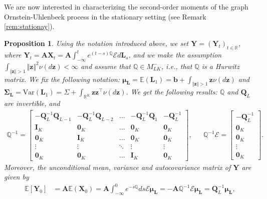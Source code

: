 \documentclass[12pt]{amsart}
\newtheorem{prop}{Proposition}[section]
\numberwithin{equation}{section}
\newcommand{\E}{\mathbb{E}}
\newcommand{\1}{\mathbf{1}}
\begin{document}
We are now interested in characterizing the second-order moments of the graph Ornstein-Uhlenbeck process in the stationary setting (see Remark \ref{rem:stationay}). 
\begin{prop}\label{prop:secondorder} Using the notation introduced above, we set $\mathbf{Y}=(\mathbf{Y}_t)_{t\in \mathbb{R}}$, where $\mathbf{Y}_t=\mathbf{A}\mathbf{X}_t=\mathbf{A}\int_{-\infty}^t e^{(t-s)\mathbb{Q}}\mathcal{E}d\mathbf{L}_s$, and we make the assumption $\int_{\Vert\mathbf{z}\Vert>1}\Vert\mathbf{z}\Vert^2\nu(d\mathbf{z})<\infty$ and assume that
$\mathbb{Q}\in M_{LK}^-$, i.e., that $\mathbb{Q}$ is a Hurwitz matrix. We fix the following notation:
$\boldsymbol{\mu}_{\mathbf{L}}=\E(\mathbf{L}_1)=\mathbf{b}+\int_{\Vert\mathbf{z}\Vert>1}\mathbf{z}\nu(d\mathbf{z})$ and $\boldsymbol{\Sigma}_{\mathbf{L}}=\text{Var}(\mathbf{L}_1)=\Sigma +\int_{\mathbb{R}^K}\mathbf{z}\mathbf{z}^{\top} \nu(d\mathbf{z})$. We get the following results: $\mathbb{Q}$ and $\mathbf{Q}_L$ are invertible, and  
    \begin{align*}
  \mathbb{Q}^{-1}
 =
 \begin{bmatrix}
 -\mathbf{Q}_L^{-1}\mathbf{Q}_{L-1} & -\mathbf{Q}_L^{-1}\mathbf{Q}_{L-2} & \dots & -\mathbf{Q}_L^{-1}\mathbf{Q}_1 & -\mathbf{Q}_L^{-1}\\
 \mathbf{I}_{K} & \mathbf{0}_{K} & \dots & \mathbf{0}_{K} & \mathbf{0}_{K}\\
 \mathbf{0}_{K} & \mathbf{I}_{K} & \dots & \mathbf{0}_{K} & \mathbf{0}_{K}\\
 \vdots & \vdots & \ddots & \vdots & \vdots\\
 \mathbf{0}_{K} & \mathbf{0}_{K} & \dots & \mathbf{I}_{K} & \mathbf{0}_{K}
 \end{bmatrix},
 &&  \mathbb{Q}^{-1}\mathcal{E}=
 \begin{bmatrix}
 - \mathbf{Q}_{L}^{-1}\\
    \mathbf{0}_{K}\\
    \mathbf{0}_{K}\\
    \vdots\\
    \mathbf{0}_{K}   
\end{bmatrix}.
\end{align*}
Moreover, the unconditional mean, variance and autocovariance matrix of $\mathbf{Y}$ are given by
\begin{align*}
    \E[\mathbf{Y}_0] 
    &= \mathbf{A}\E(\mathbf{X}_0)=\mathbf{A}\int_{-\infty}^0e^{-s\mathbb{Q}} ds \mathcal{E}\boldsymbol{\mu}_{\mathbf{L}} = -\mathbf{A}\mathbb{Q}^{-1}\mathcal{E}\boldsymbol{\mu}_{\mathbf{L}}=\mathbf{Q}_L^{-1}\boldsymbol{\mu}_{\mathbf{L}},\\

\end{align*}
\end{prop}
\end{document}
